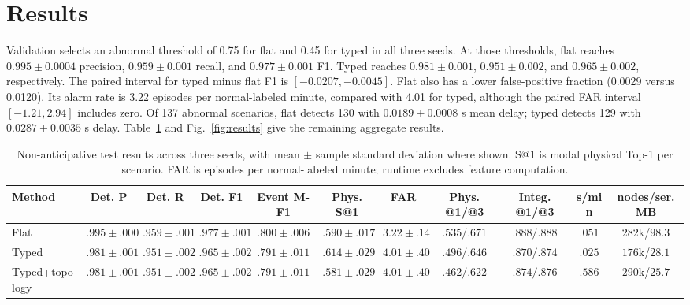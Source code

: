 \documentclass[conference]{IEEEtran}
\begin{document}
\section{Results}
Validation selects an abnormal threshold of 0.75 for flat and 0.45 for typed in all three seeds. At those thresholds, flat reaches $0.995\pm0.0004$ precision, $0.959\pm0.001$ recall, and $0.977\pm0.001$ F1. Typed reaches $0.981\pm0.001$, $0.951\pm0.002$, and $0.965\pm0.002$, respectively. The paired interval for typed minus flat F1 is $[-0.0207,-0.0045]$. Flat also has a lower false-positive fraction (0.0029 versus 0.0120). Its alarm rate is 3.22 episodes per normal-labeled minute, compared with 4.01 for typed, although the paired FAR interval $[-1.21,2.94]$ includes zero. Of 137 abnormal scenarios, flat detects 130 with $0.0189\pm0.0008$ s mean delay; typed detects 129 with $0.0287\pm0.0035$ s delay. Table~\ref{tab:results} and Fig.~\ref{fig:results} give the remaining aggregate results.

\begin{table}[!t]
\centering
\caption{Non-anticipative test results across three seeds, with mean $\pm$ sample standard deviation where shown. S@1 is modal physical Top-1 per scenario. FAR is episodes per normal-labeled minute; runtime excludes feature computation.}
\label{tab:results}
\renewcommand{\arraystretch}{1.08}
\scriptsize
\setlength{\tabcolsep}{3.3pt}
\begin{tabular}{@{}lcccccccccc@{}}
\toprule
\textbf{Method} & \textbf{Det. P} & \textbf{Det. R} & \textbf{Det. F1} & \textbf{Event M-F1} & \textbf{Phys. S@1} & \textbf{FAR} & \textbf{Phys. @1/@3} & \textbf{Integ. @1/@3} & \textbf{s/min} & \textbf{nodes/ser. MB} \\
\midrule
Flat & $\mathbf{.995\pm.000}$ & $\mathbf{.959\pm.001}$ & $\mathbf{.977\pm.001}$ & $\mathbf{.800\pm.006}$ & $.590\pm.017$ & $\mathbf{3.22\pm.14}$ & $\mathbf{.535/.671}$ & $\mathbf{.888/.888}$ & $.051$ & $282$k/$98.3$ \\
Typed & $.981\pm.001$ & $.951\pm.002$ & $.965\pm.002$ & $.791\pm.011$ & $\mathbf{.614\pm.029}$ & $4.01\pm.40$ & $.496/.646$ & $.870/.874$ & $\mathbf{.025}$ & $176$k/$28.1$ \\
Typed+topology & $.981\pm.001$ & $.951\pm.002$ & $.965\pm.002$ & $.791\pm.011$ & $.581\pm.029$ & $4.01\pm.40$ & $.462/.622$ & $.874/.876$ & $.586$ & $290$k/$25.7$ \\
\bottomrule
\end{tabular}
\end{table}
\end{document}
